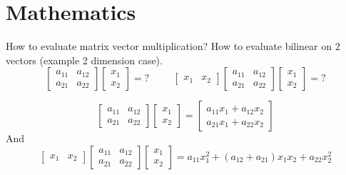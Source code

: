 \documentclass[answers]{exam}
\begin{document}
\section{Mathematics}
\begin{questions}
\question How to evaluate matrix vector multiplication? How to evaluate bilinear on 2 vectors (example 2 dimension case).
\[
\left[ 
\begin{array}{cc}
a_{11} & a_{12}\\
a_{21} & a_{22}
\end{array} 
\right]
\left[ 
\begin{array}{c}
x_{1}\\
x_{2}
\end{array} 
\right]
=?
\hspace{1cm}
\left[ 
\begin{array}{cc}
x_{1} & x_{2}
\end{array} 
\right]
\left[ 
\begin{array}{cc}
a_{11} & a_{12}\\
a_{21} & a_{22}
\end{array} 
\right]
\left[ 
\begin{array}{c}
x_{1}\\
x_{2}
\end{array} 
\right]
=?
\]
\begin{solution}[.2in]
\[
\left[ 
\begin{array}{cc}
a_{11} & a_{12}\\
a_{21} & a_{22}
\end{array} 
\right]
\left[ 
\begin{array}{c}
x_{1}\\
x_{2}
\end{array} 
\right]
=
\left[ 
\begin{array}{c}
a_{11}x_1 + a_{12}x_2\\
a_{21}x_1 + a_{22}x_2
\end{array} 
\right]
\]
And
\[
\left[ 
\begin{array}{cc}
x_{1} & x_{2}
\end{array} 
\right]
\left[ 
\begin{array}{cc}
a_{11} & a_{12}\\
a_{21} & a_{22}
\end{array} 
\right]
\left[ 
\begin{array}{c}
x_{1}\\
x_{2}
\end{array} 
\right]
=
a_{11}x^2_1 + (a_{12}+a_{21})x_1x_2 + a_{22}x^2_2
\]
\end{solution}


\end{questions}
\end{document}
